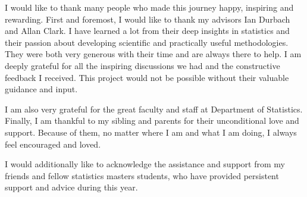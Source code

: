 \documentclass[
12pt, %
english, %
singlespacing, %
parskip, %
headsepline, %
openany %
]{MastersDoctoralThesis} %
\numberwithin{theorem}{section}
\numberwithin{remark}{section}
\numberwithin{assumption}{section}
\begin{document}
\begin{titlepage}
\begin{center}
\vfill
\end{center}
\end{titlepage}


\begin{acknowledgements}
\addchaptertocentry{\acknowledgementname} 
\vspace{1.5cm}
I would like to thank many people who made this journey happy, inspiring and rewarding. First and foremost, I would like to thank my advisors Ian Durbach and Allan Clark. I have learned a lot from their deep insights in statistics and their passion about developing scientific and practically useful methodologies.  They were both very generous with their time and are always there to help. I am deeply grateful for all the inspiring discussions we had and the constructive feedback I received. This project would not be possible without their valuable guidance and input. 

\vspace{0.3cm}

I am also very grateful for the great faculty and staff at Department of Statistics. Finally, I am thankful to my sibling and parents for their unconditional love and support. Because of them, no matter where I am and what I am doing, I always feel encouraged and loved.

\vspace{0.3cm}

I would additionally like to acknowledge the assistance and support from my friends and fellow statistics masters students, who have provided persistent support and advice during this year.

\end{acknowledgements}


\end{document}
